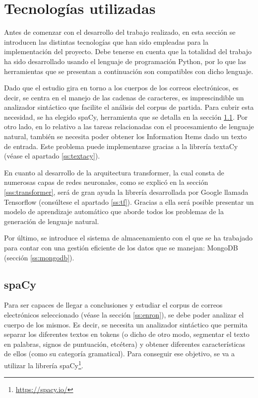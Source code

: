 \section{Tecnologías utilizadas}\label{s:tech}
Antes de comenzar con el desarrollo del trabajo realizado, en esta sección se introducen las distintas tecnologías que han sido empleadas para la implementación del proyecto. Debe tenerse en cuenta que la totalidad del trabajo ha sido desarrollado usando el lenguaje de programación Python, por lo que las herramientas que se presentan a continuación son compatibles con dicho lenguaje. 

Dado que el estudio gira en torno a los cuerpos de los correos electrónicos, es decir, se centra en el manejo de las cadenas de caracteres, es imprescindible un analizador sintáctico que facilite el análisis del corpus de partida. Para cubrir esta necesidad, se ha elegido spaCy, herramienta que se detalla en la sección \ref{ss:spacy}. Por otro lado, en lo relativo a las tareas relacionadas con el procesamiento de lenguaje natural, también se necesita poder obtener los Information Items dado un texto de entrada. Este problema puede implementarse gracias a la librería textaCy (véase el apartado \ref{ss:textacy}).

En cuanto al desarrollo de la arquitectura transformer, la cual consta de numerosas capas de redes neuronales, como se explicó en la sección \ref{sss:transformer}, será de gran ayuda la librería desarrollada por Google llamada Tensorflow (consúltese el apartado \ref{ss:tf}). Gracias a ella será posible presentar un modelo de aprendizaje automático que aborde todos los problemas de la generación de lenguaje natural.

Por último, se introduce el sistema de almacenamiento con el que se ha trabajado para contar con una gestión eficiente de los datos que se manejan: MongoDB (sección \ref{ss:mongodb}).

\subsection{spaCy}\label{ss:spacy}
Para ser capaces de llegar a conclusiones y estudiar el corpus de correos electrónicos seleccionado (véase la sección \ref{ss:enron}), se debe poder analizar el cuerpo de los mismos. Es decir, se necesita un analizador sintáctico que permita separar los diferentes textos en tokens (o dicho de otro modo, segmentar el texto en palabras, signos de puntuación, etcétera) y obtener diferentes características de ellos (como su categoría gramatical). Para conseguir ese objetivo, se va a utilizar la librería spaCy\footnote{\url{https://spacy.io/}}.

